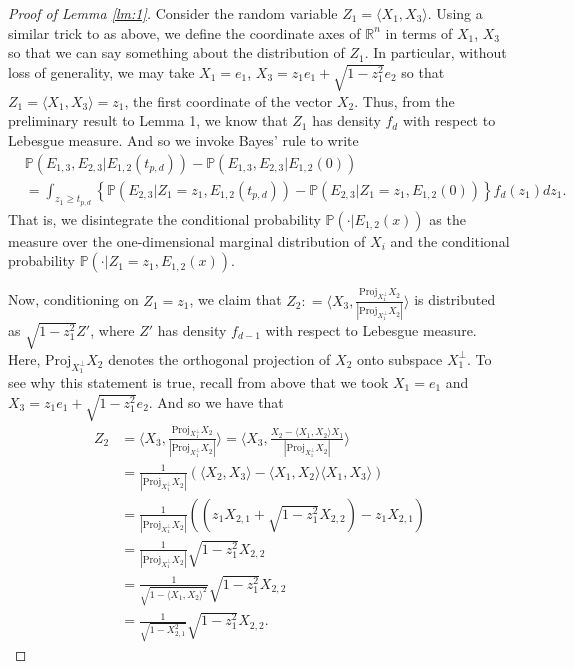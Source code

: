 \documentclass{article}
\begin{document}
\begin{proof}[Proof of Lemma \ref{lm:1}]
Consider the random variable $Z_1 = \langle X_1, X_3 \rangle$. Using a similar trick to as above, we define the coordinate axes of $\mathbb{R}^n$ in terms of $X_1$, $X_3$ so that we can say something about the distribution of $Z_1$. In particular, without loss of generality, we may take $X_1 = e_1$, $X_3 = z_1e_1 + \sqrt{1 - z_1^2}e_2$ so that $Z_1 = \langle X_1, X_3 \rangle = z_1$, the first coordinate of the vector $X_2$. Thus, from the preliminary result to Lemma 1, we know that $Z_1$ has density $f_d$ with respect to Lebesgue measure. And so we invoke Bayes' rule to write 
\begin{align}
    &\mathbb{P}(E_{1,3}, E_{2,3} | E_{1,2}(t_{p,d}))  - \mathbb{P}(E_{1, 3}, E_{2,3}| E_{1,2}(0)) \nonumber \\
    &= \int_{z_1 \geq t_{p, d}} \left\{ \mathbb{P} (E_{2,3} | Z_1 = z_1, E_{1,2}(t_{p,d}))  -  \mathbb{P} (E_{2,3} | Z_1 = z_1, E_{1,2}(0)) \right\} f_d(z_1) d z_1.\label{eq5}
\end{align}
That is, we disintegrate the conditional probability $\mathbb{P}(\cdot | E_{1,2}(x))$ as the measure over the one-dimensional marginal distribution of $X_i$ and the conditional probability $\mathbb{P}(\cdot | Z_1 = z_1, E_{1,2}(x))$.

Now, conditioning on $Z_1 = z_1$, we claim that $Z_2 : = \bigg\langle X_3, \frac{\text{Proj}_{X_1^{\perp}}X_2}{\left| \text{Proj}_{X_1^{\perp}}X_2 \right|} \bigg\rangle$ is distributed as $\sqrt{1-z_1^2}Z'$, where $Z'$ has density $f_{d-1}$ with respect to Lebesgue measure. Here, $\text{Proj}_{X_1^{\perp}}X_2$ denotes the orthogonal projection of $X_2$ onto subspace $X_1^{\perp}$. To see why this statement is true, recall from above that we took $X_1 = e_1$ and $X_3 = z_1e_1 + \sqrt{1-z_1^2}e_2$. And so we have that 
\begin{align*}
    Z_2 &= \bigg\langle X_3, \frac{\text{Proj}_{X_1^{\perp}}X_2}{\left| \text{Proj}_{X_1^{\perp}}X_2 \right|} \bigg\rangle = \bigg\langle X_3, \frac{X_2 - \langle X_1, X_2 \rangle X_1}{\left| \text{Proj}_{X_1^{\perp}}X_2 \right|} \bigg\rangle\\
    &= \frac{1}{\left| \text{Proj}_{X_1^{\perp}}X_2 \right|} \left( \langle X_2, X_3 \rangle - \langle X_1, X_2 \rangle \langle X_1, X_3 \rangle \right)\\
    &= \frac{1}{\left| \text{Proj}_{X_1^{\perp}}X_2 \right|} \left( \left( z_1X_{2,1} + \sqrt{1 - z_1^2}X_{2,2} \right) - z_1X_{2,1} \right)\\
    &= \frac{1}{\left| \text{Proj}_{X_1^{\perp}}X_2 \right|} \sqrt{1 - z_1^2}X_{2,2}\\
    &= \frac{1}{\sqrt{1 - \langle X_1, X_2 \rangle^2}} \sqrt{1 - z_1^2}X_{2,2}\\
    &= \frac{1}{\sqrt{1 - X_{2,1}^2}} \sqrt{1 - z_1^2}X_{2,2}.
\end{align*}


\end{proof}
\end{document}
